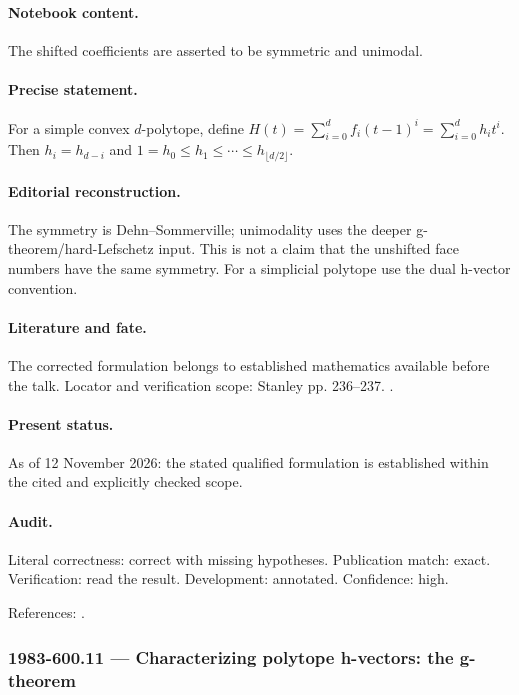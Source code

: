 \paragraph{Notebook content.} The shifted coefficients are asserted to be symmetric and unimodal.

\paragraph{Precise statement.} For a simple convex \(d\)-polytope, define \(H(t)=\sum_{i=0}^df_i(t-1)^i=\sum_{i=0}^dh_it^i\). Then \(h_i=h_{d-i}\) and \(1=h_0\le h_1\le\cdots\le h_{\lfloor d/2\rfloor}\).

\paragraph{Editorial reconstruction.} The symmetry is Dehn--Sommerville; unimodality uses the deeper g-theorem/hard-Lefschetz input. This is not a claim that the unshifted face numbers have the same symmetry. For a simplicial polytope use the dual h-vector convention.

\paragraph{Literature and fate.} The corrected formulation belongs to established mathematics available before the talk. Locator and verification scope: Stanley pp. 236--237. \cite{stanley1980faces,danilov1978toric}.

\paragraph{Present status.} As of 12 November 2026: the stated qualified formulation is established within the cited and explicitly checked scope.

\paragraph{Audit.} Literal correctness: correct with missing hypotheses. Publication match: exact. Verification: read the result. Development: annotated. Confidence: high.

\noindent References: \citep{stanley1980faces,danilov1978toric}.\par

\subsubsection{1983-600.11 --- Characterizing polytope h-vectors: the g-theorem}

